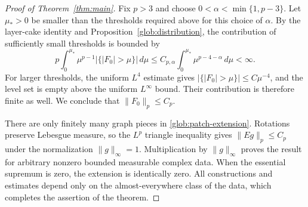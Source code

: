 \begin{proof}[Proof of Theorem~\ref{thm:main}]
Fix $p>3$ and choose $0<\alpha<\min\{1,p-3\}$.
Let $\mu_*>0$ be smaller than the thresholds required above for this
choice of $\alpha$.
By the layer-cake identity and Proposition~\ref{glob:distribution},
the contribution of sufficiently small thresholds is bounded by
\[
 p\int_0^{\mu_*}\mu^{p-1}
      |\{|F_0|>\mu\}|\,d\mu
 \le C_{p,\alpha}\int_0^{\mu_*}\mu^{p-4-\alpha}\,d\mu
 <\infty.
\]
For larger thresholds, the uniform $L^4$ estimate gives
$|\{|F_0|>\mu\}|\le C\mu^{-4}$, and the level set is empty
above the uniform $L^\infty$ bound. Their contribution is therefore
finite as well. We conclude that $\|F_0\|_p\le C_p$.

There are only finitely many graph pieces in
\eqref{glob:patch-extension}. Rotations preserve Lebesgue measure,
so the $L^p$ triangle inequality gives $\|Eg\|_p\le C_p$ under
the normalization $\|g\|_\infty=1$. Multiplication by
$\|g\|_\infty$ proves the result for arbitrary nonzero bounded
measurable complex data. When the essential supremum is zero, the
extension is identically zero. All constructions and estimates
depend only on the almost-everywhere class of the data, which
completes the assertion of the theorem.
\end{proof}
